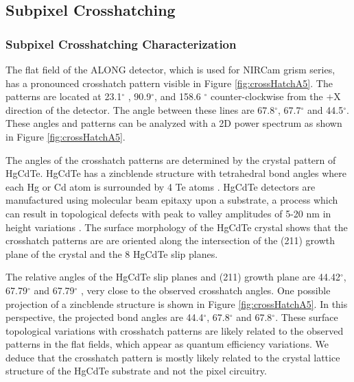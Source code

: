 \documentclass{aastex62}
\newcommand{\degree}{^\circ}
\begin{document}
\clearpage
\subsection{Subpixel Crosshatching}

\subsubsection{Subpixel Crosshatching Characterization}
The flat field of the ALONG detector, which is used for NIRCam grism series, has a pronounced crosshatch pattern visible in Figure \ref{fig:crossHatchA5}.
The patterns are located at 23.1$\degree$ , 90.9$\degree$, and 158.6 $\degree$ counter-clockwise from the $+$X direction of the detector.
The angle between these lines are 67.8$\degree$, 67.7$\degree$ and 44.5$\degree$.
These angles and patterns can be analyzed with a 2D power spectrum as shown in Figure \ref{fig:crossHatchA5}.

The angles of the crosshatch patterns are determined by the crystal pattern of HgCdTe.
HgCdTe has a zincblende structure with tetrahedral bond angles where each Hg or Cd atom is surrounded by 4 Te atoms \citep{gemain2012mercVacanciesHgCdTe}.
HgCdTe detectors are manufactured using molecular beam epitaxy upon a substrate, a process which can result in topological defects with peak to valley amplitudes of 5-20 nm in height variations \citep{chang2008surfaceMorphologyHgCdTe}.
The surface morphology of the HgCdTe crystal shows that the crosshatch patterns are are oriented along the intersection of the (211) growth plane of the crystal and the 8 HgCdTe slip planes.

The relative angles of the HgCdTe slip planes and (211) growth plane are 44.42$\degree$, 67.79$\degree$ and 67.79$\degree$ \citep{chang2008surfaceMorphologyHgCdTe}, very close to the observed crosshatch angles.
One possible projection of a zincblende structure is shown in Figure \ref{fig:crossHatchA5}.
In this perspective, the projected bond angles are 44.4$\degree$, 67.8$\degree$ and 67.8$\degree$.
These surface topological variations with crosshatch patterns are likely related to the observed patterns in the flat fields, which appear as quantum efficiency variations.
We deduce that the crosshatch pattern is mostly likely related to the crystal lattice structure of the HgCdTe substrate and not the pixel circuitry.
\end{document}
